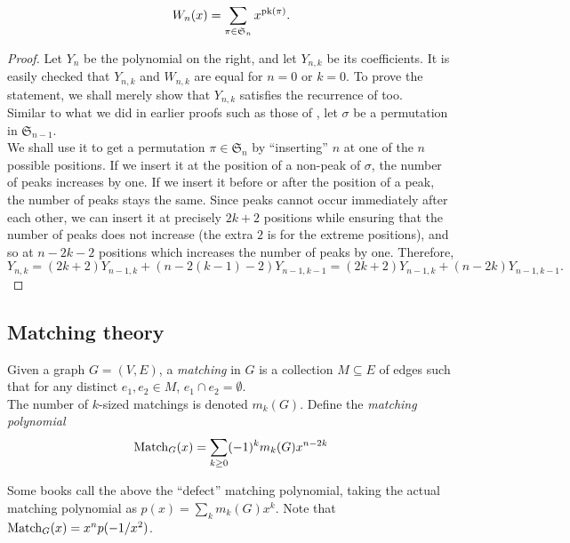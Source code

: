 	\begin{ftheo}
		\[ W_n(x) = \sum_{\pi \in \mathfrak{S}_n} x^{\operatorname{pk}(\pi)}. \]
	\end{ftheo}
	\begin{proof}
		Let $Y_n$ be the polynomial on the right, and let $Y_{n,k}$ be its coefficients. It is easily checked that $Y_{n,k}$ and $W_{n,k}$ are equal for $n=0$ or $k=0$. To prove the statement, we shall merely show that $Y_{n,k}$ satisfies the recurrence of  too.\\
		Similar to what we did in earlier proofs such as those of , let $\sigma$ be a permutation in $\mathfrak{S}_{n-1}$.\\ We shall use it to get a permutation $\pi \in \mathfrak{S}_n$ by ``inserting'' $n$ at one of the $n$ possible positions. If we insert it at the position of a non-peak of $\sigma$, the number of peaks increases by one. If we insert it before or after the position of a peak, the number of peaks stays the same. Since peaks cannot occur immediately after each other, we can insert it at precisely $2k+2$ positions while ensuring that the number of peaks does not increase (the extra $2$ is for the extreme positions), and so at $n-2k-2$ positions which increases the number of peaks by one. Therefore,
		\[ Y_{n,k} = (2k+2)Y_{n-1,k} + (n-2(k-1)-2)Y_{n-1,k-1} = (2k+2) Y_{n-1,k} + (n-2k)Y_{n-1,k-1}. \]
	\end{proof}



\subsection{Matching theory}

	\begin{fdef}[Matching]
		Given a graph $G = (V,E)$, a \emph{matching} in $G$ is a collection $M \subseteq E$ of edges such that for any distinct $e_1,e_2 \in M$, $e_1 \cap e_2 = \emptyset$.\\
		The number of $k$-sized matchings is denoted $m_k(G)$. Define the \emph{matching polynomial}
		\[ \operatorname{Match}_G(x) = \sum_{k \ge 0} (-1)^k m_k(G) x^{n-2k} \]
	\end{fdef}
	Some books call the above the ``defect'' matching polynomial, taking the actual matching polynomial as $p(x) = \sum_k m_k(G) x^k$. Note that $\operatorname{Match}_G(x) = x^n p(-1/x^2)$. 
	
